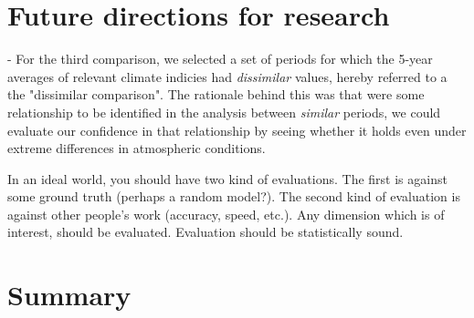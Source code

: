 \section{Future directions for research}

- For the third comparison, we selected a set of periods for which the 5-year averages of relevant climate indicies had \textit{dissimilar} values, hereby referred to a the "dissimilar comparison". The rationale behind this was that were some relationship to be identified in the analysis between \textit{similar} periods, we could evaluate our confidence in that relationship by seeing whether it holds even under extreme differences in atmospheric conditions.

In an ideal world, you should have two kind of evaluations. The first is against some ground truth (perhaps a random model?). The second kind of evaluation is against other people's work (accuracy, speed, etc.). Any dimension which is of interest, should be evaluated.  Evaluation should be statistically sound.

\Blindtext

\section*{Summary}
\blindtext